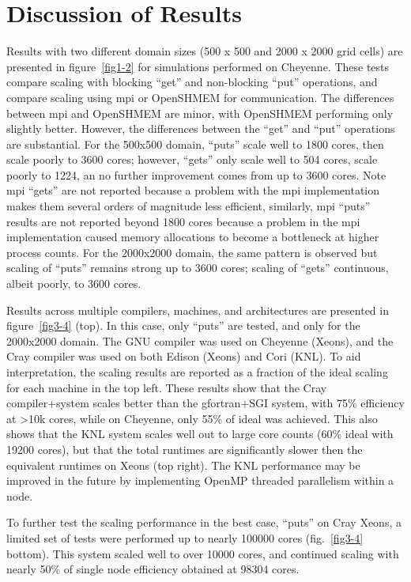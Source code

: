 \section{Discussion of Results}
Results with two different domain sizes (500 x 500 and 2000 x 2000 grid cells) are presented in figure~\ref{fig1-2} for simulations performed on Cheyenne.
These tests compare scaling with blocking ``get'' and non-blocking ``put'' operations, and compare scaling using \gls{mpi} or OpenSHMEM for communication.
The differences between \gls{mpi} and OpenSHMEM are minor, with OpenSHMEM performing only slightly better.
However, the differences between the ``get'' and ``put'' operations are substantial.
For the 500x500 domain, ``puts'' scale well to 1800 cores, then scale poorly to \num{3600} cores;
however, ``gets'' only scale well to \num{504} cores, scale poorly to \num{1224}, an no further improvement comes from up to \num{3600} cores.
Note \gls{mpi} ``gets'' are not reported because a problem with the \gls{mpi} implementation makes them several orders of magnitude less efficient,
similarly, \gls{mpi} ``puts'' results are not reported beyond \num{1800} cores because a problem in the \gls{mpi} implementation caused memory allocations to become a bottleneck at higher process counts.
For the 2000x2000 domain, the same pattern is observed but scaling of ``puts'' remains strong up to 3600 cores;
scaling of ``gets'' continuous, albeit poorly, to \num{3600} cores.

Results across multiple compilers, machines, and architectures are presented in figure~\ref{fig3-4} (top).
In this case, only ``puts'' are tested, and only for the 2000x2000 domain.
The GNU compiler was used on Cheyenne (Xeons), and the Cray compiler was used on both Edison (Xeons) and Cori (KNL).
To aid interpretation, the scaling results are reported as a fraction of the ideal scaling for each machine in the top left.
These results show that the Cray compiler+system scales better than the gfortran+SGI system,
with 75\% efficiency at >10k cores, while on Cheyenne, only 55\% of ideal was achieved.
This also shows that the KNL system scales well out to large core counts (60\% ideal with \num{19200} cores),
but that the total runtimes are significantly slower then the equivalent runtimes on Xeons (top right).
The KNL performance may be improved in the future by implementing OpenMP threaded parallelism within a node.

To further test the scaling performance in the best case, ``puts'' on Cray Xeons, a limited set of tests were performed up to nearly \num{100000} cores (fig.~\ref{fig3-4} bottom).
This system scaled well to over \num{10000} cores, and continued scaling with nearly 50\% of single node efficiency obtained at \num{98304} cores.

